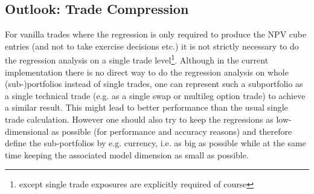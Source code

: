 \subsection{Outlook: Trade Compression}

For vanilla trades where the regression is only required to produce the NPV cube entries (and not to take exercise
decisions etc.) it is not strictly necessary to do the regression analysis on a single trade level\footnote{except
  single trade exposures are explicitly required of course}. Although in the current implementation there is no direct
way to do the regression analysis on whole (sub-)portfolios instead of single trades, one can represent such a
subportfolio as a single technical trade (e.g. as a single swap or multileg option trade) to achieve a similar
result. This might lead to better performance than the usual single trade calculation. However one should also try to
keep the regressions as low-dimensional as possible (for performance and accuracy reasons) and therefore define the
sub-portfolios by e.g. currency, i.e. as big as possible while at the same time keeping the associated model dimension as
small as possible.
